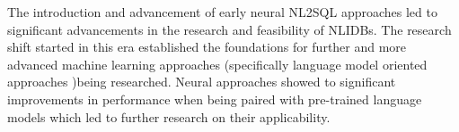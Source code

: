 The introduction and advancement of early neural NL2SQL approaches led to significant advancements in the research and feasibility
of NLIDBs. The research shift started in this era established the foundations for further and more advanced machine learning 
approaches (specifically language model oriented approaches )being researched. Neural approaches showed to significant 
improvements in performance when being paired with pre-trained language models \citep{RATSQL} which led to further research on 
their applicability.


